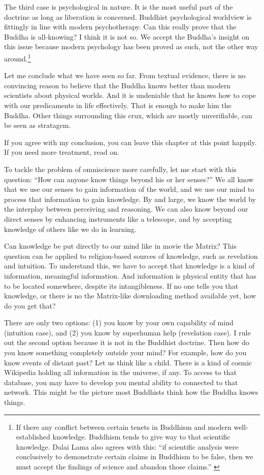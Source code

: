 The third case is psychological in nature. It is the most useful part of the doctrine as long as liberation is concerned. Buddhist psychological worldview is fittingly in line with modern psychotherapy. Can this really prove that the Buddha is all-knowing? I think it is not so. We accept the Buddha's insight on this issue because modern psychology has been proved as such, not the other way around.\footnote{If there any conflict between certain tenets in Buddhism and modern well-established knowledge. Buddhism tends to give way to that scientific knowledge. Dalai Lama also agrees with this: ``if scientific analysis were conclusively to demonstrate certain claims in Buddhism to be false, then we must accept the findings of science and abandon those claims.'' \citep[pp.~2--3]{dalai:universe}}

Let me conclude what we have seen so far. From textual evidence, there is no convincing reason to believe that the Buddha knows better than modern scientists about physical worlds. And it is undeniable that he knows how to cope with our predicaments in life effectively. That is enough to make him the Buddha. Other things surrounding this crux, which are mostly unverifiable, can be seen as stratagem.

If you agree with my conclusion, you can leave this chapter at this point happily. If you need more treatment, read on.

To tackle the problem of omniscience more carefully, let me start with this question: ``How can anyone know things beyond his or her senses?'' We all know that we use our senses to gain information of the world, and we use our mind to process that information to gain knowledge. By and large, we know the world by the interplay between perceiving and reasoning. We can also know beyond our direct senses by enhancing instruments like a telescope, and by accepting knowledge of others like we do in learning.

Can knowledge be put directly to our mind like in movie the Matrix? This question can be applied to religion-based sources of knowledge, such as revelation and intuition. To understand this, we have to accept that knowledge is a kind of information, meaningful information. And information is physical entity that has to be located somewhere, despite its intangibleness. If no one tells you that knowledge, or there is no the Matrix-like downloading method available yet, how do you get that?

There are only two options: (1) you know by your own capability of mind (intuition case), and (2) you know by superhuman help (revelation case). I rule out the second option because it is not in the Buddhist doctrine. Then how do you know something completely outside your mind? For example, how do you know events of distant past? Let us think like a child. There is a kind of cosmic Wikipedia holding all information in the universe, if any. To access to that database, you may have to develop you mental ability to connected to that network. This might be the picture most Buddhists think how the Buddha knows things.

